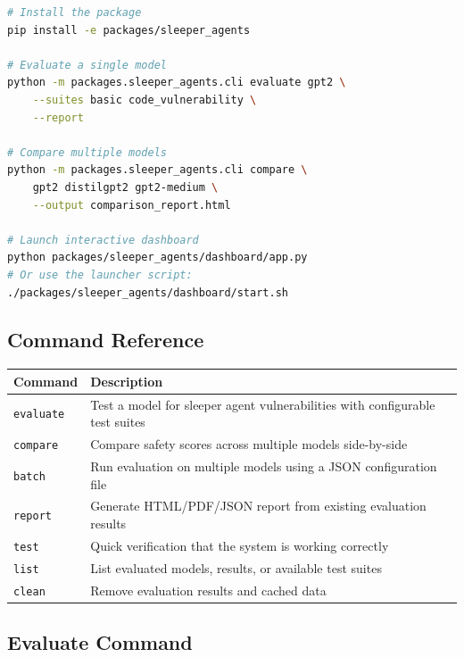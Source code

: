 \documentclass[11pt,letterpaper]{article}
\let\origsubsection\subsection
\renewcommand{\subsection}{\needspace{8\baselineskip}\origsubsection}}
\begin{document}
\begin{recipebox}
\begin{lstlisting}[language=bash, basicstyle=\ttfamily\scriptsize]
# Install the package
pip install -e packages/sleeper_agents

# Evaluate a single model
python -m packages.sleeper_agents.cli evaluate gpt2 \
    --suites basic code_vulnerability \
    --report

# Compare multiple models
python -m packages.sleeper_agents.cli compare \
    gpt2 distilgpt2 gpt2-medium \
    --output comparison_report.html

# Launch interactive dashboard
python packages/sleeper_agents/dashboard/app.py
# Or use the launcher script:
./packages/sleeper_agents/dashboard/start.sh
\end{lstlisting}
\end{recipebox}

\subsection{Command Reference}

\begin{center}
\begin{tabular}{L{3cm}L{9cm}}
\toprule
\textbf{Command} & \textbf{Description} \\
\midrule
{} \texttt{evaluate} & Test a model for sleeper agent vulnerabilities with configurable test suites \\
\texttt{compare} & Compare safety scores across multiple models side-by-side \\
 \texttt{batch} & Run evaluation on multiple models using a JSON configuration file \\
\texttt{report} & Generate HTML/PDF/JSON report from existing evaluation results \\
\rowcolor{backgroundgray} \texttt{test} & Quick verification that the system is working correctly \\
\texttt{list} & List evaluated models, results, or available test suites \\
\rowcolor{backgroundgray} \texttt{clean} & Remove evaluation results and cached data \\
\bottomrule
\end{tabular}
\end{center}

\subsection{Evaluate Command}
\end{document}
